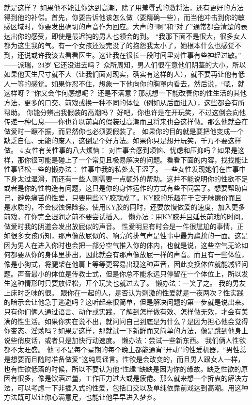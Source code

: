 \documentclass[12pt,UTF8]{ctexbook}
\begin{document}
就是这样？
如果他不能让你达到高潮，除了用羞辱式的激将法，还有更好的方法得到他的补偿。首先，你要告诉他该怎么做（要精确一些），而当他冲击到你的敏感区域时，你要发出确切的声音作为回应。大声的“啊”和“对了”通常都会清楚的表达出你的感受，即使是最迟钝的男人也领会的到。
“我那下面不是很大，很多女人都为这生我的气。有一个女孩还没完没了的抱怨我太小了，她根本什么也感觉不到，还说或许我该去看看医生。这让我在很长一段时间里对性事有些神经过敏。”
——派瑞，24岁
它还没进去吗？
众所周知，男人们很在意他们阴茎的大小，所以如果他天生尺寸就不大（让我们面对现实，确实有这样的人），就不要再让他有低人一等的感觉。如果你忍不住，想象一下他向你的胸罩内看去，然后说，“嗯，就这样呀？”你又会作何感想呢？
还是不满意？那就想一下能改善你的性生活的其他方法，更多的口交、前戏或换一种不同的体位（例如从后面进入），这些都会有所帮助。
你能分辨出我假装的高潮吗？
好吧，你也许是在开玩笑，不过这倒会向他传递一种信息——你也许以前真的假装过高潮而且将来也会这样做。那么他就会在做爱时一蹶不振，而显然你也必须要假装了。
如果你的目的就是要把他变成一个缺乏自信、无能的废人，这倒是个好方法。如果你只是想开玩笑，千万不要这样做。
4.女性有关性事的八大烦恼：
对性事会感到烦恼、忧虑和压抑吗？如果是这样，那你很可能是碰上了一个常见且极易解决的问题。看看下面的内容，找找能让性事轻松一些的懒办法：
性事中我的私处太干涩了。
一些女性发现她们在性事中下身太过湿滑，而还有一些人则需要一点额外的帮助。这并不能说明你的性欲不足或者是你的性构造有问题，这只是你的身体运作的方式有些不同罢了。想要帮助自己，避免痛苦的性爱，只要用些KY胶就成了。KY胶的乐趣在于它无味廉价而且是水质的，不会侵蚀保险套。使用KY胶的同时，还要放慢做爱的速度，加入更多前戏，在你完全湿润之前不要尝试插入。
懒办法：用KY胶并且延长前戏的时间。
做爱时我的阴道会发出放屁似的声音。
性爱明显有时会是一件很尴尬的事情，正如很多女孩所知，那声像放屁似的、响亮的排气声是性事中最为尴尬的一面。这是因为男人在进入你时也会把一部分空气推入你的体内，也就是说，这些空气无论如何都要从你的身体里排出，因此就会有那声像放屁一样的声音。而且有一些体位，像是小狗式，将腿架在他肩上等等更容易出现这种声音，因此变换体位就能减轻问题。声音最小的体位是传教士式，但是你总不能永远只停留在一个体位上，所以发生这种情形时只要放轻松，开个玩笑也就过去了。
懒办法：一笑了之。
我的男友上床时乏味的很。
跟你在一起的人，是否认为刺激的性爱就是一夜两次？性实践的暗示会让他急于逃避吗？这听起来很简单，但是解决问题的第一步就是说出来。只有你们俩人通过语言、动作或实践，了解到怎样做有效、怎样做无效，才会有美满的性生活。如果你实在说不出，就问问自己到底是为什么？是因为担心他会觉得你变态、淫荡吗？如果是这样，那就试一下新鲜而又简单的方法，像是跳到他身上说些俏皮话，或者只是加快行动速度。
懒办法：尝试一些新东西。
我们俩人性欲都不太旺盛。
他可不是每个星期的每个晚上都能通宵“开动”的性爱机器，“男性总是想要而且随时准备做爱”这纯属谣言。性欲是会改变的，而且男人跟女人一样，也有性欲低落的时候，所以不要认为他“性趣”缺缺是因为你的缘故。缺乏性欲的原因有很多，像是饮酒过量，工作压力过大或是疲倦。那么就来想一个折衷的解决方法，可以考虑一下非插入式的性爱，包括口交以及单纯依靠前戏达到高潮。用这种方法既可以让你心满意足，也能让他早早进入梦乡。
\end{document}
